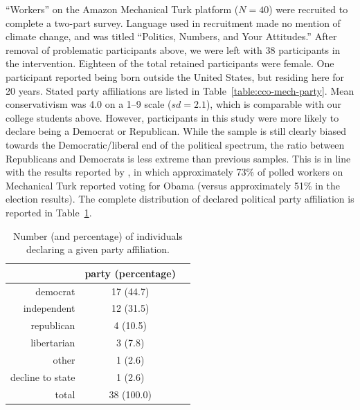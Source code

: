 “Workers” on the Amazon Mechanical Turk platform ($N=40$) were recruited to
complete a two-part survey. Language used in recruitment made no mention of
climate change, and was titled “Politics, Numbers, and Your Attitudes.” After
removal of problematic participants above, we were left with 38 participants in
the intervention. Eighteen of the total retained participants were female. One
participant reported being born outside the United States, but residing here for
20 years. Stated party affiliations are listed in
Table~\ref{table:cco-mech-party}. Mean conservativism was 4.0 on a 1--9 scale
($sd=2.1$), which is comparable with our college students above. However,
participants in this study were more likely to declare being a Democrat or
Republican.  While the sample is still clearly biased towards the
Democratic/liberal end of the political spectrum, the ratio between Republicans
and Democrats is less extreme than previous samples. This is in line with the
results reported by \textcite{richey_how_2012}, in which approximately 73\% of
polled workers on Mechanical Turk reported voting for Obama (versus
approximately 51\% in the election results).  The complete distribution of
declared political party affiliation is reported in
Table~\ref{table:CCO-ndi-party}.

\begin{table}[ht]
    \caption{Number (and percentage) of individuals declaring a given party
        affiliation.}
    \label{table:CCO-ndi-party}
\centering
\begin{tabular}{rcc}
  \toprule
      & party (percentage) \\ 
  \midrule
  democrat &  17 (44.7) \\ 
  independent &  12 (31.5) \\ 
  republican &   4 (10.5) \\ 
  libertarian &   3 (7.8) \\ 
  other &   1 (2.6) \\ 
  decline to state &   1 (2.6) \\ 
  \midrule
  total &  38 (100.0) \\ 
   \bottomrule
\end{tabular}
\end{table}


